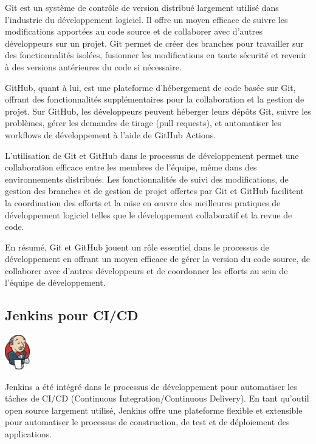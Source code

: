 \documentclass[a4paper, 11pt, openany]{report}
\begin{document}
Git est un système de contrôle de version distribué largement utilisé dans l'industrie du développement logiciel. Il offre un moyen efficace de suivre les modifications apportées au code source et de collaborer avec d'autres développeurs sur un projet. Git permet de créer des branches pour travailler sur des fonctionnalités isolées, fusionner les modifications en toute sécurité et revenir à des versions antérieures du code si nécessaire.

GitHub, quant à lui, est une plateforme d'hébergement de code basée sur Git, offrant des fonctionnalités supplémentaires pour la collaboration et la gestion de projet. Sur GitHub, les développeurs peuvent héberger leurs dépôts Git, suivre les problèmes, gérer les demandes de tirage (pull requests), et automatiser les workflows de développement à l'aide de GitHub Actions.

L'utilisation de Git et GitHub dans le processus de développement permet une collaboration efficace entre les membres de l'équipe, même dans des environnements distribués. Les fonctionnalités de suivi des modifications, de gestion des branches et de gestion de projet offertes par Git et GitHub facilitent la coordination des efforts et la mise en œuvre des meilleures pratiques de développement logiciel telles que le développement collaboratif et la revue de code.

En résumé, Git et GitHub jouent un rôle essentiel dans le processus de développement en offrant un moyen efficace de gérer la version du code source, de collaborer avec d'autres développeurs et de coordonner les efforts au sein de l'équipe de développement.


\subsection{Jenkins pour CI/CD}
\begin{center}
\includegraphics[height=1.5cm]{jenkins.png}
\end{center}

Jenkins a été intégré dans le processus de développement pour automatiser les tâches de CI/CD (Continuous Integration/Continuous Delivery). En tant qu'outil open source largement utilisé, Jenkins offre une plateforme flexible et extensible pour automatiser le processus de construction, de test et de déploiement des applications.
\end{document}
